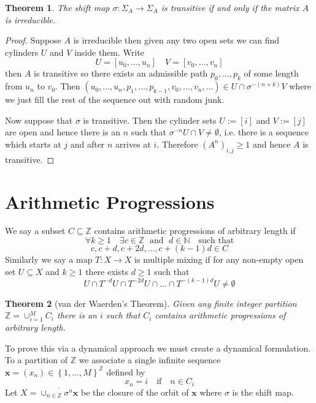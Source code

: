 \documentclass[11pt]{article}
\newcommand{\defeq}{:=}
\newcommand{\Z}{\mathbb{Z}}
\newcommand{\N}{\mathbb{N}}
\newcommand{\mv}[1]{\textbf{#1}}
\newenvironment{defin}
	{\begin{mdframed}[backgroundcolor=white, roundcorner=5pt, linewidth=1pt, linecolor=Green]
		\setlength{\parindent}{0pt}}
	{\end{mdframed}}
\newcommand{\mdf}[1]{{\color{Green} #1}}
\newtheorem{theorem}{Theorem}[section]
\begin{document}
\begin{theorem}
The shift map $\sigma: \Sigma_A \to \Sigma_A$ is transitive if and only if the matrix $A$ is irreducible.
\end{theorem}

\begin{proof}
Suppose $A$ is irreducible then given any two open sets we can find cylinders $U$ and $V$ inside them.
Write
\[
	U=[ u_0, \dots, u_n] \quad V=[v_0, \dots, v_n]
\]
then $A$ is transitive so there exists an admissible path $p_0, \dots, p_k$ of some length from $u_n$ to $v_0$.
Then $(u_0, \dots, u_n, p_1, \dots, p_{k-1}, v_0, \dots, v_n, \dots)\in U \cap \sigma^{-(n+k)} V$ where we just fill the rest of the sequence out with random junk.

Now suppose that $\sigma$ is transitive.
Then the cylinder sets $U\defeq [i]$ and $V\defeq [j]$ are open and hence there is an $n$ such that $\sigma^{-n}U \cap V\neq\emptyset$, i.e. there is a sequence which starts at $j$ and after $n$ arrives at $i$.
Therefore $(A^n)_{i,j} \geq 1$ and hence $A$ is transitive.

\end{proof}

\section{Arithmetic Progressions}
\begin{defin}
	We say a subset $C\subseteq \Z$ \mdf{contains arithmetic progressions of arbitrary length} if
\[
	\forall k \geq 1 \quad \exists c\in \Z \;\text{ and }\; d\in\N \quad \text{such that}
\]\[
	c, c+d, c+ 2d, \dots, c+ (k-1)d\in C
\]
Similarly we say a map $T:X\to X$ is \mdf{multiple mixing} if for any non-empty open set $U\subseteq X$ and $k\geq 1$ there exists $d\geq 1$ such that
\[
	U\cap T^{-d}U \cap T^{-2d}U \cap \dots \cap T^{-(k-1)d}U\neq \emptyset
\]
\end{defin}

\begin{theorem}[van der Waerden's Theorem]
Given any finite integer partition $\Z=\cup_{i=1}^M C_i$ there is an $i$ such that $C_i$ contains arithmetic progressions of arbitrary length.
\end{theorem}

To prove this via a dynamical approach we must create a dynamical formulation.
To a partition of $\Z$ we associate  a single infinite sequence $\mv{x}=(x_n)\in\left\{1, \dots, M\right\}^\Z$ defined by
\[
	x_n=i\quad\text{if}\quad n\in C_i
\]
Let $X=\overline{\cup_{n\in\Z}\sigma^n\mv{x}}$ be the closure of the orbit of $\mv{x}$ where $\sigma$ is the shift map.
\end{document}
